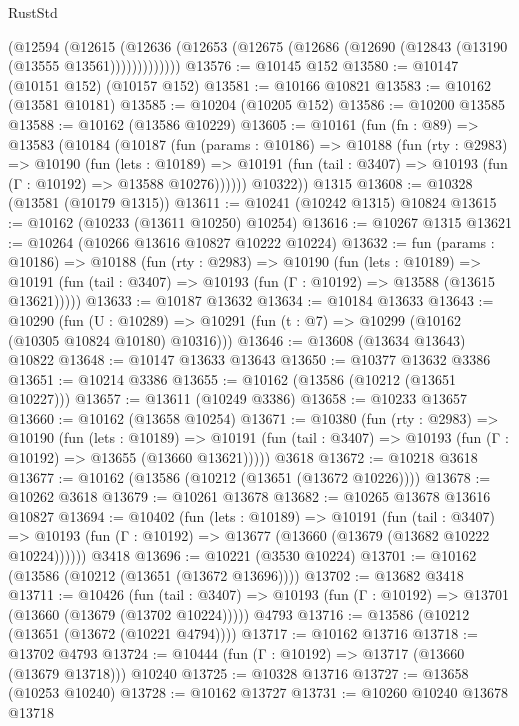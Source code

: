 \begin{lexlean}{RustStd}
\begin{coremodule}
          (@12594
            (@12615
              (@12636 (@12653 (@12675 (@12686 (@12690 (@12843 (@13190 (@13555 @13561)))))))))))))
@13576 := @10145 @152
@13580 := @10147 (@10151 @152) (@10157 @152)
@13581 := @10166 @10821
@13583 := @10162 (@13581 @10181)
@13585 := @10204 (@10205 @152)
@13586 := @10200 @13585
@13588 := @10162 (@13586 @10229)
@13605 := @10161
    (fun (fn : @89) =>
    @13583
      (@10184
        (@10187
          (fun (params : @10186) =>
          @10188
            (fun (rty : @2983) =>
            @10190
              (fun (lets : @10189) =>
              @10191 (fun (tail : @3407) => @10193 (fun (Γ : @10192) => @13588 @10276))))))
        @10322))
    @1315
@13608 := @10328 (@13581 (@10179 @1315))
@13611 := @10241 (@10242 @1315) @10824
@13615 := @10162 (@10233 (@13611 @10250) @10254)
@13616 := @10267 @1315
@13621 := @10264 (@10266 @13616 @10827 @10222 @10224)
@13632 := fun (params : @10186) =>
  @10188
    (fun (rty : @2983) =>
    @10190
      (fun (lets : @10189) =>
      @10191 (fun (tail : @3407) => @10193 (fun (Γ : @10192) => @13588 (@13615 @13621)))))
@13633 := @10187 @13632
@13634 := @10184 @13633
@13643 := @10290
    (fun (U : @10289) => @10291 (fun (t : @7) => @10299 (@10162 (@10305 @10824 @10180) @10316)))
@13646 := @13608 (@13634 @13643) @10822
@13648 := @10147 @13633 @13643
@13650 := @10377 @13632 @3386
@13651 := @10214 @3386
@13655 := @10162 (@13586 (@10212 (@13651 @10227)))
@13657 := @13611 (@10249 @3386)
@13658 := @10233 @13657
@13660 := @10162 (@13658 @10254)
@13671 := @10380
    (fun (rty : @2983) =>
    @10190
      (fun (lets : @10189) =>
      @10191 (fun (tail : @3407) => @10193 (fun (Γ : @10192) => @13655 (@13660 @13621)))))
    @3618
@13672 := @10218 @3618
@13677 := @10162 (@13586 (@10212 (@13651 (@13672 @10226))))
@13678 := @10262 @3618
@13679 := @10261 @13678
@13682 := @10265 @13678 @13616 @10827
@13694 := @10402
    (fun (lets : @10189) =>
    @10191
      (fun (tail : @3407) =>
      @10193 (fun (Γ : @10192) => @13677 (@13660 (@13679 (@13682 @10222 @10224))))))
    @3418
@13696 := @10221 (@3530 @10224)
@13701 := @10162 (@13586 (@10212 (@13651 (@13672 @13696))))
@13702 := @13682 @3418
@13711 := @10426
    (fun (tail : @3407) => @10193 (fun (Γ : @10192) => @13701 (@13660 (@13679 (@13702 @10224)))))
    @4793
@13716 := @13586 (@10212 (@13651 (@13672 (@10221 @4794))))
@13717 := @10162 @13716
@13718 := @13702 @4793
@13724 := @10444 (fun (Γ : @10192) => @13717 (@13660 (@13679 @13718))) @10240
@13725 := @10328 @13716
@13727 := @13658 (@10253 @10240)
@13728 := @10162 @13727
@13731 := @10260 @10240 @13678 @13718

\end{coremodule}
\end{lexlean}
